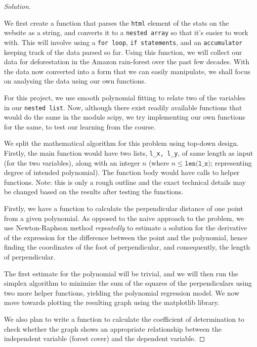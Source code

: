 \documentclass[12pt]{article}
\newenvironment{solution}
  {\renewcommand\qedsymbol{$\blacksquare$}
  \begin{proof}[Solution]}
  {\end{proof}}
\renewcommand\qedsymbol{$\blacksquare$}
\begin{document}
\begin{enumerate}
\begin{solution}\

We first create a function that parses the \texttt{html} element of the stats on the website as a string, and converts it to a \texttt{nested array} so that it’s easier to work with. This will involve using a \texttt{for loop}, \texttt{if statements}, and an \texttt{accumulator} keeping track of the data parsed so far. Using this function, we will collect our data for deforestation in the Amazon rain-forest over the past few decades. With the data now converted into a form that we can easily manipulate, we shall focus on analysing the data using our own functions.

For this project, we use smooth polynomial fitting to relate two of the variables in our \texttt{nested list}. Now, although there exist readily available functions that would do the same in the module scipy, we try implementing our own functions for the same, to test our learning from the course.

We split the mathematical algorithm for this problem using top-down design. Firstly, the main function would have two lists, \texttt{l\_x, l\_y}, of same length as input (for the two variables), along with an integer $n$ (where $n \leq \texttt{len(l\_x)}$; representing degree of intended polynomial). The function body would have calls to helper functions. Note: this is only a rough outline and the exact technical details may be changed based on the results after testing the functions.

Firstly, we have a function to calculate the perpendicular distance of one point from a given polynomial. As opposed to the naive approach to the problem, we use Newton-Raphson method \textit{repeatedly} to estimate a solution for the derivative of the expression for the difference between the point and the polynomial, hence finding the coordinates of the foot of perpendicular, and consequently, the length of perpendicular.

The first estimate for the polynomial will be trivial, and we will then run the simplex algorithm to minimize the sum of the squares of the perpendiculars using two more helper functions, yielding the polynomial regression model. We now move towards plotting the resulting graph using the matplotlib library.

We also plan to write a function to calculate the coefficient of determination to check whether the graph shows an appropriate relationship between the independent variable (forest cover) and the dependent variable. 


\end{solution}
\end{enumerate}
\end{document}
